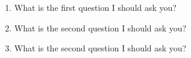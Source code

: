 \documentclass[a4paper]{article}
\begin{document}
\maketitleheader
\begin{enumerate}
\item What is the first question I should ask you? 


\item What is the second question I should ask you? 

\item What is the second question I should ask you? 

\end{enumerate}
\end{document}
